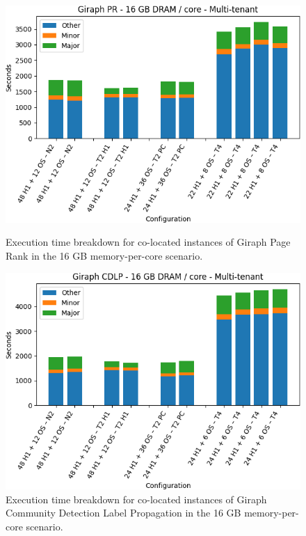 \begin{figure}[thbp]
        \centering
    \includegraphics[width=\linewidth]{./fig/g_pr128.png}
    \caption{Execution time breakdown for co-located instances of Giraph
    Page Rank in the 16 GB memory-per-core scenario.}
    \label{fig:g_pr128}
    \includegraphics[width=\linewidth]{./fig/g_cdlp128.png}
    \caption{Execution time breakdown for co-located instances of Giraph
    Community Detection Label Propagation in the 16 GB memory-per-core scenario.}
    \label{fig:g_cdlp128}
\end{figure}

